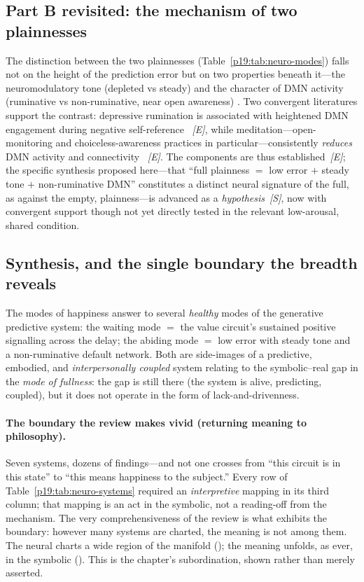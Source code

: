 \subsection{Part B revisited: the mechanism of two plainnesses}
\label{p19:sub:neuro-fullness}

The distinction between the two plainnesses (Table~\ref{p19:tab:neuro-modes}) falls not on the height of the prediction error but on two properties beneath it---the neuromodulatory tone (depleted vs steady) and the character of DMN activity (ruminative vs non-ruminative, near open awareness) \parencite{friston2010,raichle2001,northoff2006,brewer2011}. Two convergent literatures support the contrast: depressive rumination is associated with heightened DMN engagement during negative self-reference \parencite{hamilton2015,nolenhoeksema2008}~\emph{[E]}, while meditation---open-monitoring and choiceless-awareness practices in particular---consistently \emph{reduces} DMN activity and connectivity \parencite{brewer2011,garrison2015}~\emph{[E]}. The components are thus established~\emph{[E]}; the specific synthesis proposed here---that ``full plainness $=$ low error $+$ steady tone $+$ non-ruminative DMN'' constitutes a distinct neural signature of the full, as against the empty, plainness---is advanced as a \emph{hypothesis}~\emph{[S]}, now with convergent support though not yet directly tested in the relevant low-arousal, shared condition.

\subsection{Synthesis, and the single boundary the breadth reveals}
\label{p19:sub:neuro-synth}

The modes of happiness answer to several \emph{healthy} modes of the generative predictive system: the waiting mode $=$ the value circuit's sustained positive signalling across the delay; the abiding mode $=$ low error with steady tone and a non-ruminative default network. Both are side-images of a predictive, embodied, and \emph{interpersonally coupled} system relating to the symbolic--real gap in the \emph{mode of fullness}: the gap is still there (the system is alive, predicting, coupled), but it does not operate in the form of lack-and-drivenness.

\paragraph{The boundary the review makes vivid (returning meaning to philosophy).} Seven systems, dozens of findings---and not one crosses from ``this circuit is in this state'' to ``this means happiness to the subject.'' Every row of Table~\ref{p19:tab:neuro-systems} required an \emph{interpretive} mapping in its third column; that mapping is an act in the symbolic, not a reading-off from the mechanism. The very comprehensiveness of the review is what exhibits the boundary: however many systems are charted, the meaning is not among them. The neural charts a wide region of the manifold (); the meaning unfolds, as ever, in the symbolic (). This is the chapter's subordination, shown rather than merely asserted.
